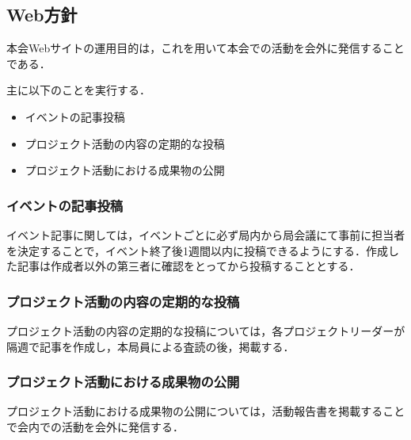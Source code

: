 \subsection*{Web方針}


本会Webサイトの運用目的は，これを用いて本会での活動を会外に発信することである．

主に以下のことを実行する．
\begin{itemize}
\item イベントの記事投稿
\item プロジェクト活動の内容の定期的な投稿
\item プロジェクト活動における成果物の公開
\end{itemize}

\subsubsection*{イベントの記事投稿}
イベント記事に関しては，イベントごとに必ず局内から局会議にて事前に担当者を決定することで，イベント終了後1週間以内に投稿できるようにする．作成した記事は作成者以外の第三者に確認をとってから投稿することとする．

\subsubsection*{プロジェクト活動の内容の定期的な投稿}
プロジェクト活動の内容の定期的な投稿については，各プロジェクトリーダーが隔週で記事を作成し，本局員による査読の後，掲載する．

\subsubsection*{プロジェクト活動における成果物の公開}
プロジェクト活動における成果物の公開については，活動報告書を掲載することで会内での活動を会外に発信する．
